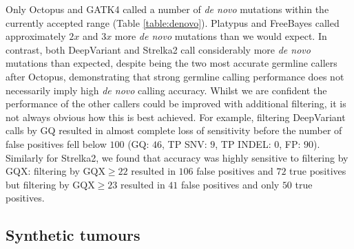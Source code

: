 \documentclass[notitlepage, twocolumn]{article}
\begin{document}
Only Octopus and GATK4 called a number of \textit{de novo} mutations within the currently accepted range (Table \ref{table:denovo}). Platypus and FreeBayes called approximately $2x$ and $3x$ more \textit{de novo} mutations than we would expect. In contrast, both DeepVariant and Strelka2 call considerably more \emph{de novo} mutations than expected, despite being the two most accurate germline callers after Octopus, demonstrating that strong germline calling performance does not necessarily imply high \textit{de novo} calling accuracy. Whilst we are confident the performance of the other callers could be improved with additional filtering, it is not always obvious how this is best achieved. For example, filtering DeepVariant calls by GQ resulted in almost complete loss of sensitivity before the number of false positives fell below $100$ (GQ: $46$, TP SNV: $9$, TP INDEL: $0$, FP: $90$). Similarly for Strelka2, we found that accuracy was highly sensitive to filtering by GQX: filtering by $\text{GQX} \ge 22$ resulted in $106$ false positives and $72$ true positives but filtering by $\text{GQX} \ge 23$ resulted in $41$ false positives and only $50$ true positives.

\subsection*{Synthetic tumours}
\end{document}
